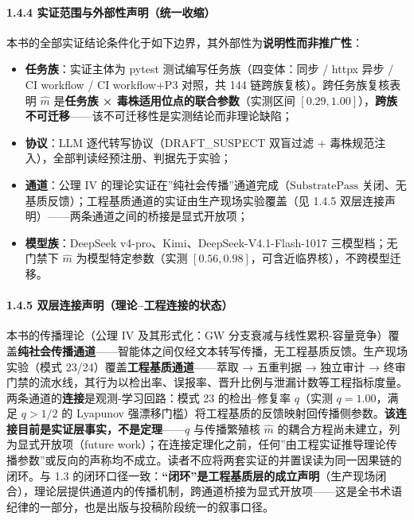 \paragraph{1.4.4
实证范围与外部性声明（统一收缩）}\label{ux5b9eux8bc1ux8303ux56f4ux4e0eux5916ux90e8ux6027ux58f0ux660eux7edfux4e00ux6536ux7f29}

本书的全部实证结论条件化于如下边界，其外部性为\textbf{说明性而非推广性}：

\begin{itemize}
\tightlist
\item
  \textbf{任务族}：实证主体为 pytest 测试编写任务族（四变体：同步 /
  httpx 异步 / CI workflow / CI workflow+P3 对照，共 144
  链跨族复核）。跨任务族复核表明 \(\hat m\) 是\textbf{任务族 ×
  毒株适用位点的联合参数}（实测区间
  \([0.29,1.00]\)），\textbf{跨族不可迁移}------该不可迁移性是实测结论而非理论缺陷；
\item
  \textbf{协议}：LLM 逐代转写协议（DRAFT\_SUSPECT 双盲过滤 +
  毒株规范注入），全部判读经预注册、判据先于实验；
\item
  \textbf{通道}：公理 IV
  的理论实证在''纯社会传播''通道完成（\(\mathrm{SubstratePass}\)
  关闭、无基质反馈）；工程基质通道的实证由生产现场实验覆盖（见 1.4.5
  双层连接声明）------两条通道之间的桥接是显式开放项；
\item
  \textbf{模型族}：DeepSeek v4-pro、Kimi、DeepSeek-V4.1-Flash-1017
  三模型档；无门禁下 \(\hat m\) 为模型特定参数（实测
  \([0.56,0.98]\)，可含近临界核），不跨模型迁移。
\end{itemize}

\paragraph{1.4.5
双层连接声明（理论--工程连接的状态）}\label{ux53ccux5c42ux8fdeux63a5ux58f0ux660eux7406ux8bbaux5de5ux7a0bux8fdeux63a5ux7684ux72b6ux6001}

本书的传播理论（公理 IV 及其形式化：GW
分支衰减与线性累积-容量竞争）覆盖\textbf{纯社会传播通道}------智能体之间仅经文本转写传播，无工程基质反馈。生产现场实验（模式
23/24）覆盖\textbf{工程基质通道}------萃取 → 五重判据 → 独立审计 →
终审门禁的流水线，其行为以检出率、误报率、晋升比例与泄漏计数等工程指标度量。两条通道的\textbf{连接}是观测-学习回路：模式
23 的检出--修复率 \(q\)（实测 \(q=1.00\)，满足 \(q>1/2\) 的 Lyapunov
强漂移门槛）将工程基质的反馈映射回传播侧参数。\textbf{该连接目前是实证层事实，不是定理}------\(q\)
与传播繁殖核 \(\hat m\) 的耦合方程尚未建立，列为显式开放项（future
work）；在连接定理化之前，任何''由工程实证推导理论传播参数''或反向的声称均不成立。读者不应将两套实证的并置误读为同一因果链的闭环。与
1.3
的闭环口径一致：\textbf{``闭环''是工程基质层的成立声明}（生产现场闭合），理论层提供通道内的传播机制，跨通道桥接为显式开放项------这是全书术语纪律的一部分，也是出版与投稿阶段统一的叙事口径。

